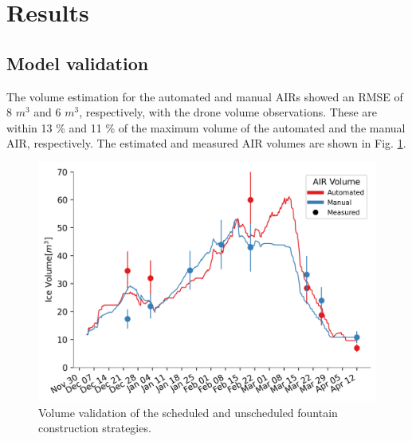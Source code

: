 \documentclass[tc, manuscript]{copernicus}
\begin{document}
\section{Results}

\subsection{Model validation}

The volume estimation for the automated and manual AIRs showed an RMSE of 8 $m^3$ and 6 $m^3$, respectively, with the drone
volume observations. These are within 13 \% and 11 \% of the maximum volume of the automated and
the manual AIR, respectively. The estimated and measured AIR volumes are shown in Fig. \ref{fig:validation}.  

\begin{figure}[htb] \includegraphics[width=12cm] {Figures/validation.png} 
  \caption{Volume validation of the scheduled and unscheduled fountain construction strategies.} 
  \label{fig:validation} \end{figure}
\end{document}
